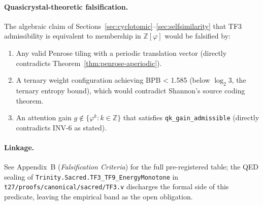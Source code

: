 \paragraph{Quasicrystal-theoretic falsification.}
The algebraic claim of Sections~\ref{sec:cyclotomic}--\ref{sec:selfsimilarity}
that TF3 admissibility is equivalent to membership in
\(\mathbb{Z}[\varphi]\) would be falsified by:
\begin{enumerate}
  \item Any valid Penrose tiling with a periodic translation vector (directly
        contradicts Theorem~\ref{thm:penrose-aperiodic}).
  \item A ternary weight configuration achieving BPB < 1.585 (below
        \(\log_2 3\), the ternary entropy bound), which would contradict
        Shannon's source coding theorem.
  \item An attention gain \(g \notin \{\varphi^k : k \in \mathbb{Z}\}\) that
        satisfies \texttt{qk\_gain\_admissible} (directly contradicts
        INV-6 as stated).
\end{enumerate}

\paragraph{Linkage.}
See Appendix~B (\emph{Falsification Criteria}) for the full pre-registered
table; the QED sealing of \texttt{Trinity.Sacred.TF3\_TF9\_EnergyMonotone} in
\texttt{t27/proofs/canonical/sacred/TF3.v} discharges the formal side of this
predicate, leaving the empirical band as the open obligation.

